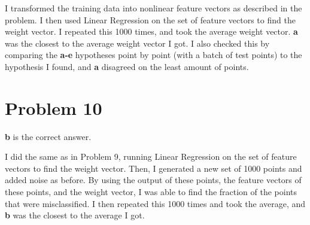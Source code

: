 \documentclass{article}
\begin{document}
\noindent I transformed the training data into nonlinear feature vectors as
described in the problem. I then used Linear Regression on the set of
feature vectors to find the weight vector. I repeated this 1000 times, and
took the average weight vector. \textbf{a} was the closest to the average
weight vector I got. I also checked this by comparing the \textbf{a-e} hypotheses
point by point (with a batch of test points) to the hypothesis I found, and
\textbf{a} disagreed on the least amount of points.
\section*{Problem 10}
\textbf{b} is the correct answer.

\noindent I did the same as in Problem 9, running Linear Regression on the
set of feature vectors to find the weight vector. Then, I generated a new
set of 1000 points and added noise as before. By using the output of these points,
the feature vectors of these points, and the weight vector, I was able to find the
fraction of the points that were misclassified. I then repeated this 1000 times and
took the average, and \textbf{b} was the closest to the average I got.
\end{document}
